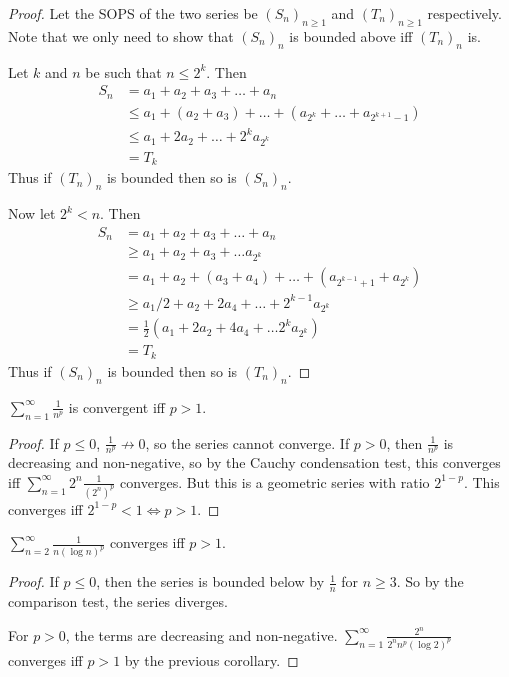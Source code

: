\begin{proof}
    Let the SOPS of the two series be $(S_n)_{n \ge 1}$ and
    $(T_n)_{n \ge 1}$ respectively.
    Note that we only need to show that $(S_n)_n$ is bounded above iff
    $(T_n)_n$ is.

    Let $k$ and $n$ be such that $n \le 2^k$.
    Then \begin{align*}
        S_n &= a_1 + a_2 + a_3 + \dots + a_n \\
        &\le a_1 + (a_2 + a_3) + \dots + (a_{2^k} + \dots + a_{2^{k+1}-1}) \\
        &\le a_1 + 2a_2 + \dots + 2^k a_{2^k} \\
        &= T_{k}
    \end{align*}
    Thus if $(T_n)_n$ is bounded then so is $(S_n)_n$.

    Now let $2^k < n$.
    Then \begin{align*}
        S_n &= a_1 + a_2 + a_3 + \dots + a_n \\
           &\ge a_1 + a_2 + a_3 + \dots a_{2^k} \\
           &= a_1 + a_2 + (a_3 + a_4) + \dots + (a_{2^{k-1}+1} + a_{2^k}) \\
           &\ge a_1/2 + a_2 + 2 a_4 + \dots + 2^{k-1} a_{2^k} \\
           &= \frac12 (a_1 + 2 a_2 + 4 a_4 + \dots 2^k a_{2^k}) \\
           &= T_k
    \end{align*}
    Thus if $(S_n)_n$ is bounded then so is $(T_n)_n$.
\end{proof}
\begin{corollary}
    $\sum_{n=1}^{\infty} \frac1{n^p}$ is convergent iff $p > 1$.
\end{corollary}
\begin{proof}
    If $p \le 0$, $\frac1{n^p} \not\to 0$, so the series cannot converge.
    If $p > 0$, then $\frac1{n^p}$ is decreasing and non-negative, so
    by the Cauchy condensation test, this converges iff
    $\sum_{n=1}^{\infty} 2^n \frac1{(2^n)^p}$ converges.
    But this is a geometric series with ratio $2^{1 - p}$.
    This converges iff $2^{1-p} < 1 \iff p > 1$.
\end{proof}

\begin{corollary}
    $\sum_{n=2}^{\infty} \frac1{n(\log n)^p}$ converges iff $p > 1$.
\end{corollary}
\begin{proof}
    If $p \le 0$, then the series is bounded below by $\frac1n$ for
    $n \ge 3$.
    So by the comparison test, the series diverges.

    For $p > 0$, the terms are decreasing and non-negative.
    $\sum_{n=1}^{\infty} \frac{2^n}{2^n n^p (\log 2)^p}$ converges iff
    $p > 1$ by the previous corollary.
\end{proof}

